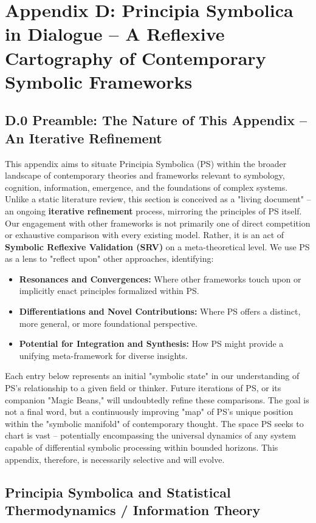 \clearpage
\chapter*{Appendix D: Principia Symbolica in Dialogue – A Reflexive Cartography of Contemporary Symbolic Frameworks}
\section*{D.0 Preamble: The Nature of This Appendix – An Iterative Refinement}
\label{sec:appD_preamble_nature_of_appendix}
This appendix aims to situate Principia Symbolica (PS) within the broader landscape of contemporary theories and frameworks relevant to symbology, cognition, information, emergence, and the foundations of complex systems. Unlike a static literature review, this section is conceived as a "living document" – an ongoing \textbf{iterative refinement} process, mirroring the principles of PS itself.
Our engagement with other frameworks is not primarily one of direct competition or exhaustive comparison with every existing model. Rather, it is an act of \textbf{Symbolic Reflexive Validation (SRV)} on a meta-theoretical level. We use PS as a lens to "reflect upon" other approaches, identifying:
\begin{itemize}
    \item \textbf{Resonances and Convergences:} Where other frameworks touch upon or implicitly enact principles formalized within PS.
    \item \textbf{Differentiations and Novel Contributions:} Where PS offers a distinct, more general, or more foundational perspective.
    \item \textbf{Potential for Integration and Synthesis:} How PS might provide a unifying meta-framework for diverse insights.
\end{itemize}
Each entry below represents an initial "symbolic state" in our understanding of PS's relationship to a given field or thinker. Future iterations of PS, or its companion "Magic Beans," will undoubtedly refine these comparisons. The goal is not a final word, but a continuously improving "map" of PS's unique position within the "symbolic manifold" of contemporary thought.
The space PS seeks to chart is vast – potentially encompassing the universal dynamics of any system capable of differential symbolic processing within bounded horizons. This appendix, therefore, is necessarily selective and will evolve.
\section*{Principia Symbolica and Statistical Thermodynamics / Information Theory}
\label{sec:appD_ps_and_stat_thermo_info_theory}
